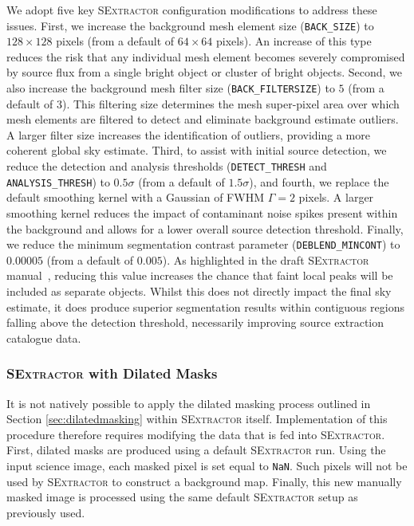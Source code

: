 \documentclass[fleqn,usenatbib,useAMS]{mnras}
\newcommand*{\SExtractor}{\textsc{SExtractor}\xspace}
\begin{document}
We adopt five key \SExtractor configuration modifications to address these issues. First, we increase the background mesh element size (\texttt{BACK\_SIZE}) to $128\times128$ pixels (from a default of $64\times64$ pixels). An increase of this type reduces the risk that any individual mesh element becomes severely compromised by source flux from a single bright object or cluster of bright objects. Second, we also increase the background mesh filter size (\texttt{BACK\_FILTERSIZE}) to $5$ (from a default of $3$). This filtering size determines the mesh super-pixel area over which mesh elements are filtered to detect and eliminate background estimate outliers. A larger filter size increases the identification of outliers, providing a more coherent global sky estimate. Third, to assist with initial source detection, we reduce the detection and analysis thresholds (\texttt{DETECT\_THRESH} and \texttt{ANALYSIS\_THRESH}) to $0.5\sigma$ (from a default of $1.5\sigma$), and fourth, we replace the default smoothing kernel with a Gaussian of FWHM $\Gamma=2$ pixels. A larger smoothing kernel reduces the impact of contaminant noise spikes present within the background and allows for a lower overall source detection threshold. Finally, we reduce the minimum segmentation contrast parameter (\texttt{DEBLEND\_MINCONT}) to $0.00005$ (from a default of $0.005$). As highlighted in the draft \SExtractor manual~\citep{SExtractorUsersManual}, reducing this value increases the chance that faint local peaks will be included as separate objects. Whilst this does not directly impact the final sky estimate, it does produce superior segmentation results within contiguous regions falling above the detection threshold, necessarily improving source extraction catalogue data. 

\subsubsection{\SExtractor with Dilated Masks}
\label{sec:sextractordilated}

It is not natively possible to apply the dilated masking process outlined in Section \ref{sec:dilatedmasking} within \SExtractor itself. Implementation of this procedure therefore requires modifying the data that is fed into \SExtractor. First, dilated masks are produced using a default \SExtractor run. Using the input science image, each masked pixel is set equal to \texttt{NaN}. Such pixels will not be used by \SExtractor to construct a background map. Finally, this new manually masked image is processed using the same default \SExtractor setup as previously used. 
\end{document}
